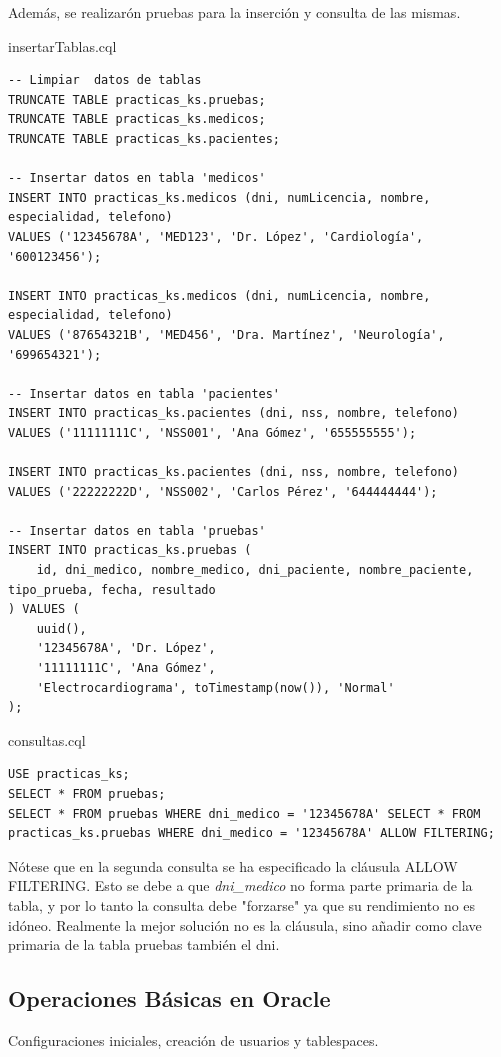 \documentclass{article}
\begin{document}
Además, se realizarón pruebas para la inserción y consulta de las mismas.
\begin{scriptbox}{insertarTablas.cql}
\begin{verbatim}
-- Limpiar  datos de tablas
TRUNCATE TABLE practicas_ks.pruebas;
TRUNCATE TABLE practicas_ks.medicos;
TRUNCATE TABLE practicas_ks.pacientes;

-- Insertar datos en tabla 'medicos'
INSERT INTO practicas_ks.medicos (dni, numLicencia, nombre, especialidad, telefono) 
VALUES ('12345678A', 'MED123', 'Dr. López', 'Cardiología', '600123456');

INSERT INTO practicas_ks.medicos (dni, numLicencia, nombre, especialidad, telefono) 
VALUES ('87654321B', 'MED456', 'Dra. Martínez', 'Neurología', '699654321');

-- Insertar datos en tabla 'pacientes'
INSERT INTO practicas_ks.pacientes (dni, nss, nombre, telefono) 
VALUES ('11111111C', 'NSS001', 'Ana Gómez', '655555555');

INSERT INTO practicas_ks.pacientes (dni, nss, nombre, telefono) 
VALUES ('22222222D', 'NSS002', 'Carlos Pérez', '644444444');

-- Insertar datos en tabla 'pruebas'
INSERT INTO practicas_ks.pruebas (
    id, dni_medico, nombre_medico, dni_paciente, nombre_paciente, tipo_prueba, fecha, resultado
) VALUES (
    uuid(),
    '12345678A', 'Dr. López',
    '11111111C', 'Ana Gómez',
    'Electrocardiograma', toTimestamp(now()), 'Normal'
);

\end{verbatim}
\end{scriptbox}

\begin{scriptbox}{consultas.cql}
\begin{verbatim}
USE practicas_ks;
SELECT * FROM pruebas;
SELECT * FROM pruebas WHERE dni_medico = '12345678A' SELECT * FROM practicas_ks.pruebas WHERE dni_medico = '12345678A' ALLOW FILTERING;
\end{verbatim}
\end{scriptbox}
Nótese que en la segunda consulta se ha especificado la cláusula ALLOW FILTERING. Esto se debe a que \textit{dni\_medico} no forma parte primaria de la tabla, y por lo tanto la consulta debe "forzarse" ya que su rendimiento no es idóneo. Realmente la mejor solución no es la cláusula, sino añadir como clave primaria de la tabla pruebas también el dni.

\subsection{Operaciones Básicas en Oracle}
Configuraciones iniciales, creación de usuarios y tablespaces.
\vspace{5mm}
\end{document}
